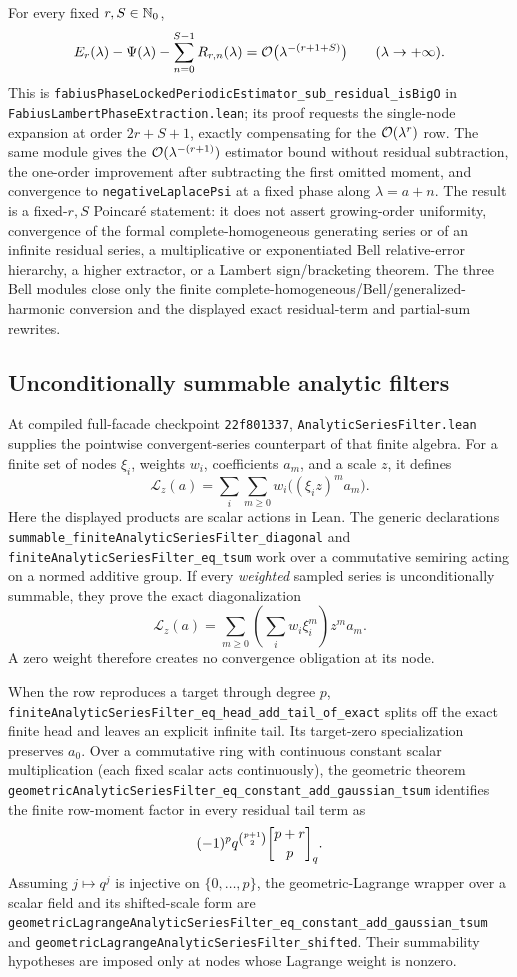 \documentclass[11pt,oneside]{article}
\theoremstyle{definition}
\theoremstyle{remark}
\begin{document}
For every fixed \(r,S\in\mathbb{N}_{0}\),
\[
 E_r(\lambda)-\Psi(\lambda)
   -\sum_{n=0}^{S-1}R_{r,n}(\lambda)
 =\mathcal{O}\bigl(\lambda^{-(r+1+S)}\bigr)
 \qquad(\lambda\to+\infty).
\]
This is
\nolinkurl{fabiusPhaseLockedPeriodicEstimator_sub_residual_isBigO} in
\nolinkurl{FabiusLambertPhaseExtraction.lean}; its proof requests the
single-node expansion at order \(2r+S+1\), exactly compensating for the
\(\mathcal{O}(\lambda^r)\) row.  The same module gives the
\(\mathcal{O}(\lambda^{-(r+1)})\) estimator bound without residual subtraction,
the one-order improvement after subtracting the first omitted moment, and
convergence to \nolinkurl{negativeLaplacePsi} at a fixed phase along
\(\lambda=a+n\).  The result is a fixed-\(r,S\) Poincaré statement: it does
not assert growing-order uniformity, convergence of the formal
complete-homogeneous generating series or of an infinite residual series, a
multiplicative or exponentiated Bell relative-error hierarchy, a higher
extractor, or a Lambert sign/bracketing theorem.  The three Bell modules close
only the finite complete-homogeneous/Bell/generalized-harmonic conversion and
the displayed exact residual-term and partial-sum rewrites.

\subsection{Unconditionally summable analytic filters}
At compiled full-facade checkpoint \nolinkurl{22f801337},
\nolinkurl{AnalyticSeriesFilter.lean} supplies the pointwise convergent-series
counterpart of that finite algebra.  For a finite set of nodes \(\xi_i\),
weights \(w_i\), coefficients \(a_m\), and a scale \(z\), it defines
\[
  \mathcal L_z(a)
  =\sum_i\sum_{m\geq0}w_i\bigl((\xi_i z)^m a_m\bigr).
\]
Here the displayed products are scalar actions in Lean.  The generic
declarations \nolinkurl{summable_finiteAnalyticSeriesFilter_diagonal} and
\nolinkurl{finiteAnalyticSeriesFilter_eq_tsum} work over a commutative
semiring acting on a normed additive group.  If every \emph{weighted} sampled
series is unconditionally summable, they prove the exact diagonalization
\[
  \mathcal L_z(a)
  =\sum_{m\geq0}\left(\sum_iw_i\xi_i^m\right)z^m a_m.
\]
A zero weight therefore creates no convergence obligation at its node.

When the row reproduces a target through degree \(p\),
\nolinkurl{finiteAnalyticSeriesFilter_eq_head_add_tail_of_exact} splits off
the exact finite head and leaves an explicit infinite tail.  Its target-zero
specialization preserves \(a_0\).  Over a commutative ring with continuous constant
scalar multiplication (each fixed scalar acts continuously), the geometric theorem
\nolinkurl{geometricAnalyticSeriesFilter_eq_constant_add_gaussian_tsum}
identifies the finite row-moment factor in every residual tail term as
\[
  (-1)^p q^{\binom{p+1}{2}}\GaussianBinomial{p+r}{p}{q}.
\]
Assuming \(j\mapsto q^j\) is injective on \(\{0,\ldots,p\}\), the geometric-Lagrange
wrapper over a scalar field and its shifted-scale form are
\nolinkurl{geometricLagrangeAnalyticSeriesFilter_eq_constant_add_gaussian_tsum}
and \nolinkurl{geometricLagrangeAnalyticSeriesFilter_shifted}.  Their
summability hypotheses are imposed only at nodes whose Lagrange weight is
nonzero.
\end{document}
